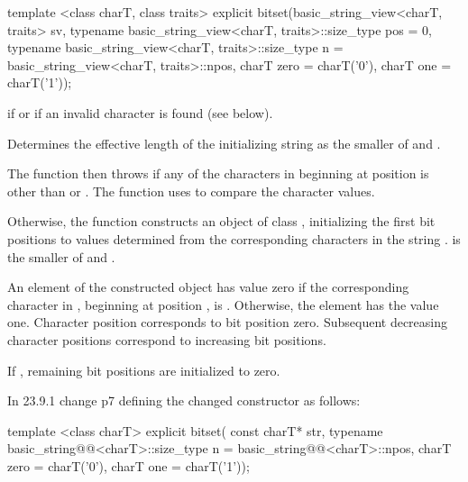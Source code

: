 \documentclass[ebook,11pt,article]{memoir}
\begin{document}
\begin{addedblock}
\begin{itemdecl}
template <class charT, class traits>
explicit
bitset(basic_string_view<charT, traits> sv,
       typename basic_string_view<charT, traits>::size_type pos = 0,
       typename basic_string_view<charT, traits>::size_type n =
         basic_string_view<charT, traits>::npos,
         charT zero = charT('0'), charT one = charT('1'));
\end{itemdecl}

\begin{itemdescr}
\pnum
\throws
{}
if
or  if an invalid character is found (see below).%

\pnum
\effects
Determines the effective length
 of the initializing string as the smaller of
 and
.

The function then throws%
if any of the 
characters in  beginning at position  is
other than  or . The function uses 
to compare the character values.

Otherwise, the function constructs an object of class
,
initializing the first  bit
positions to values determined from the corresponding characters in the string
.
 is the smaller of  and .

\pnum
An element of the constructed object has value zero if the
corresponding character in , beginning at position
, is
.
Otherwise, the element has the value one.
Character position  corresponds to bit position zero.
Subsequent decreasing character positions correspond to increasing bit positions.

\pnum
If , remaining bit positions are initialized to zero.
\end{itemdescr}
\end{addedblock}

In 23.9.1 change p7 defining the changed constructor as follows:

\begin{itemdecl}
template <class charT>
  explicit bitset(
    const charT* str,
    typename basic_string@@<charT>::size_type n = basic_string@@<charT>::npos,
    charT zero = charT('0'),
    charT one = charT('1'));
\end{itemdecl}
\end{document}
